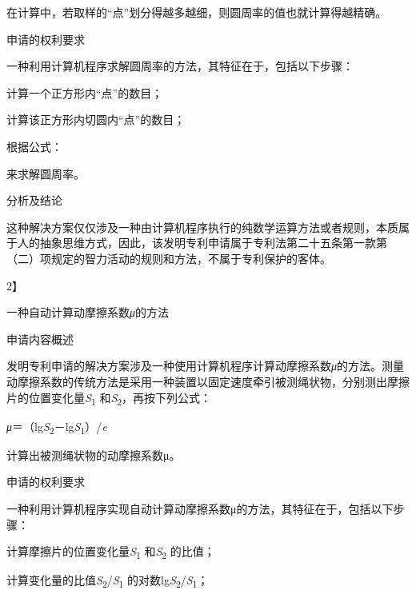 {\setlength{\parindent}{0.0bp}在计算中，若取样的“点”划分得越多越细，则圆周率的值也就计算得越精确。\par}

{\setlength{\parindent}{22.5bp}申请的权利要求\par}

一种利用计算机程序求解圆周率的方法，其特征在于，包括以下步骤：

计算一个正方形内“点”的数目；

计算该正方形内切圆内“点”的数目；

根据公式：

{\setlength{\parindent}{0.0bp}来求解圆周率。\par}

{\setlength{\parindent}{22.5bp}分析及结论\par}

这种解决方案仅仅涉及一种由计算机程序执行的纯数学运算方法或者规则，本质属于人的抽象思维方式，因此，该发明专利申请属于专利法第二十五条第一款第（二）项规定的智力活动的规则和方法，不属于专利保护的客体。

{2】\par}

一种自动计算动摩擦系数\textit{μ}的方法

{\setlength{\parindent}{22.5bp}申请内容概述\par}

发明专利申请的解决方案涉及一种使用计算机程序计算动摩擦系数\textit{μ}的方法。测量动摩擦系数的传统方法是采用一种装置以固定速度牵引被测绳状物，分别测出摩擦片的位置变化量\textit{S}\textsubscript{1} 和\textit{S}\textsubscript{2}，再按下列公式：

{\setlength{\parindent}{111.0bp}\textit{μ}＝（lg\textit{S}\textsubscript{2}－lg\textit{S}\textsubscript{1}）/\textit{e}\par}

计算出被测绳状物的动摩擦系数μ。

{\setlength{\parindent}{22.5bp}申请的权利要求\par}

一种利用计算机程序实现自动计算动摩擦系数μ的方法，其特征在于，包括以下步骤：

计算摩擦片的位置变化量\textit{S}\textsubscript{1} 和\textit{S}\textsubscript{2} 的比值；

计算变化量的比值\textit{S}\textsubscript{2}/\textit{S}\textsubscript{1} 的对数lg\textit{S}\textsubscript{2}/\textit{S}\textsubscript{1}；

